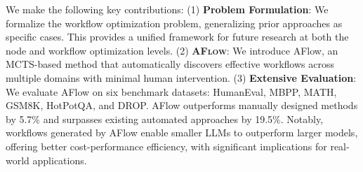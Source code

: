 \documentclass{article} %
\newcommand{\model}{{\sc AFlow}\xspace}
\newcommand{\modelbold}{\textbf{\textsc{AFlow}}\xspace}
\theoremstyle{plain}
\theoremstyle{definition}
\theoremstyle{remark}
\begin{document}
We make the following key contributions:
(1) \textbf{Problem Formulation}: We formalize the workflow optimization problem, generalizing prior approaches as specific cases. This provides a unified framework for future research at both the node and workflow optimization levels.
(2) \modelbold: We introduce \model, an MCTS-based method that automatically discovers effective workflows across multiple domains with minimal human intervention.
(3) \textbf{Extensive Evaluation}: We evaluate \model on six benchmark datasets: HumanEval, MBPP, MATH, GSM8K, HotPotQA, and DROP. \model outperforms manually designed methods by 5.7\% and surpasses existing automated approaches by 19.5\%. Notably, workflows generated by \model enable smaller LLMs to outperform larger models, offering better cost-performance efficiency, with significant implications for real-world applications.

\end{document}
